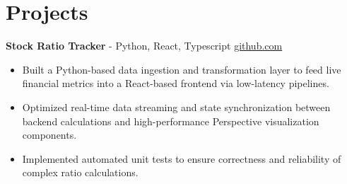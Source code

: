 \documentclass[11pt]{article}       %
\begin{document}

\vspace{-18.5pt}

\section*{Projects}

\textbf{Stock Ratio Tracker}{ - Python, React, Typescript} \hfill \href{https://github.com/Monica20030707/tradingDashboard-UI}{github.com} \\
\vspace{-9pt}
\begin{itemize}
  \item Built a Python-based data ingestion and transformation layer to feed live financial metrics into a React-based frontend via low-latency pipelines.
  \item Optimized real-time data streaming and state synchronization between backend calculations and high-performance Perspective visualization components.
  \item Implemented automated unit tests to ensure correctness and reliability of complex ratio calculations.
\end{itemize}

\end{document}
